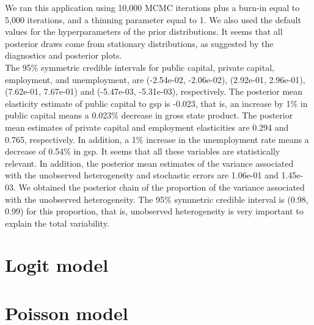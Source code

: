 We ran this application using 10,000 MCMC iterations plus a burn-in equal to 5,000 iterations, and a thinning parameter equal to 1.
We also used the default values for the hyperparameters of the prior distributions.
It seems that all posterior draws come from stationary distributions, as suggested by the diagnostics and posterior plots.\\

The 95\% symmetric credible intervals for public capital, private capital, employment, and unemployment, are (-2.54e-02, -2.06e-02), (2.92e-01, 2.96e-01), (7.62e-01, 7.67e-01) and (-5.47e-03, -5.31e-03), respectively.
The posterior mean elasticity estimate of public capital to gsp is -0.023, that is, an increase by 1\% in public capital means a 0.023\% decrease in gross state product.
The posterior mean estimates of private capital and employment elasticities are 0.294 and 0.765, respectively.
In addition, a 1\% increase in the unemployment rate means a decrease of 0.54\% in gsp.
It seems that all these variables are statistically relevant.
In addition, the posterior mean estimates of the variance associated with the unobserved heterogeneity and stochastic errors are 1.06e-01 and 1.45e-03.
We obtained the posterior chain of the proportion of the variance associated with the unobserved heterogeneity.
The 95\% symmetric credible interval is (0.98, 0.99) for this proportion, that is, unobserved heterogeneity is very important to explain the total variability.\\



\section{Logit model}\label{sec92}

\section{Poisson model}\label{sec93}